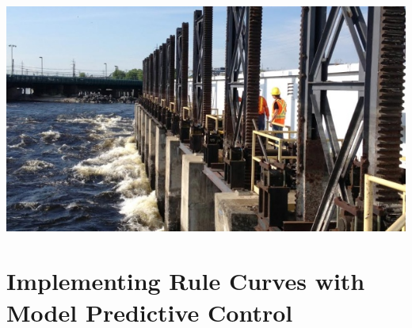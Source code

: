 \documentclass[compress,english]{beamer}
\begin{document}
{\usebackgroundtemplate%
	{\includegraphics[height=\paperheight]{fort-frances-dam.jpg}}
\section{Implementing Rule Curves with Model Predictive Control}
}
\end{document}
